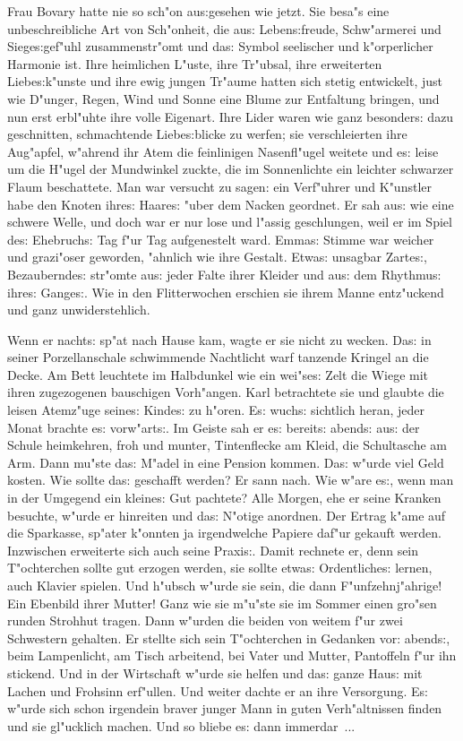 \documentclass[oneside,12pt]{book}
\newcommand{\s}{s:}%
\begin{document}
Frau Bovary hatte nie so sch"on au{\s}gesehen wie jetzt. Sie
besa"s eine unbeschreibliche Art von Sch"onheit, die au{\s}
Leben{\s}freude, Schw"armerei und Siege{\s}gef"uhl zusammenstr"omt
und da{\s} Symbol seelischer und k"orperlicher Harmonie ist. Ihre
heimlichen L"uste, ihre Tr"ubsal, ihre erweiterten
Liebe{\s}k"unste und ihre ewig jungen Tr"aume hatten sich stetig
entwickelt, just wie D"unger, Regen, Wind und Sonne eine Blume zur
Entfaltung bringen, und nun erst erbl"uhte ihre volle Eigenart.
Ihre Lider waren wie ganz besonder{\s} dazu geschnitten,
schmachtende Liebe{\s}blicke zu werfen; sie verschleierten ihre
Aug"apfel, w"ahrend ihr Atem die feinlinigen Nasenfl"ugel weitete
und e{\s} leise um die H"ugel der Mundwinkel zuckte, die im
Sonnenlichte ein leichter schwarzer Flaum beschattete. Man war
versucht zu sagen: ein Verf"uhrer und K"unstler habe den Knoten
ihre{\s} Haare{\s} "uber dem Nacken geordnet. Er sah au{\s} wie
eine schwere Welle, und doch war er nur lose und l"assig
geschlungen, weil er im Spiel de{\s} Ehebruch{\s} Tag f"ur Tag
aufgenestelt ward. Emma{\s} Stimme war weicher und grazi"oser
geworden, "ahnlich wie ihre Gestalt. Etwa{\s} unsagbar Zarte{\s},
Bezaubernde{\s} str"omte au{\s} jeder Falte ihrer Kleider und
au{\s} dem Rhythmu{\s} ihre{\s} Gange{\s}. Wie in den
Flitterwochen erschien sie ihrem Manne ent\/z"uckend und ganz
unwiderstehlich.

Wenn er nacht{\s} sp"at nach Hause kam, wagte er sie nicht zu
wecken. Da{\s} in seiner Porzellanschale schwimmende Nachtlicht
warf tanzende Kringel an die Decke. Am Bett leuchtete im
Halbdunkel wie ein wei"se{\s} Zelt die Wiege mit ihren zugezogenen
bauschigen Vorh"angen. Karl betrachtete sie und glaubte die leisen
Atemz"uge seine{\s} Kinde{\s} zu h"oren. E{\s} wuch{\s} sichtlich
heran, jeder Monat brachte e{\s} vorw"art{\s}. Im Geiste sah er
e{\s} bereit{\s} abend{\s} au{\s} der Schule heimkehren, froh und
munter, Tintenflecke am Kleid, die Schultasche am Arm. Dann mu"ste
da{\s} M"adel in eine Pension kommen. Da{\s} w"urde viel Geld
kosten. Wie sollte da{\s} geschafft werden? Er sann nach. Wie
w"are e{\s}, wenn man in der Umgegend ein kleine{\s} Gut pachtete?
Alle Morgen, ehe er seine Kranken besuchte, w"urde er hinreiten
und da{\s} N"otige anordnen. Der Ertrag k"ame auf die Sparkasse,
sp"ater k"onnten ja irgendwelche Papiere daf"ur gekauft werden.
Inzwischen erweiterte sich auch seine Praxi{\s}. Damit rechnete
er, denn sein T"ochterchen sollte gut erzogen werden, sie sollte
etwa{\s} Ordentliche{\s} lernen, auch Klavier spielen. Und h"ubsch
w"urde sie sein, die dann F"unfzehnj"ahrige! Ein Ebenbild ihrer
Mutter! Ganz wie sie m"u"ste sie im Sommer einen gro"sen runden
Strohhut tragen. Dann w"urden die beiden von weitem f"ur zwei
Schwestern gehalten. Er stellte sich sein T"ochterchen in Gedanken
vor: abend{\s}, beim Lampenlicht, am Tisch arbeitend, bei Vater
und Mutter, Pantoffeln f"ur ihn stickend. Und in der Wirtschaft
w"urde sie helfen und da{\s} ganze Hau{\s} mit Lachen und Frohsinn
erf"ullen. Und weiter dachte er an ihre Versorgung. E{\s} w"urde
sich schon irgendein braver junger Mann in guten Verh"altnissen
finden und sie gl"ucklich machen. Und so bliebe e{\s} dann
immerdar~...
\end{document}
